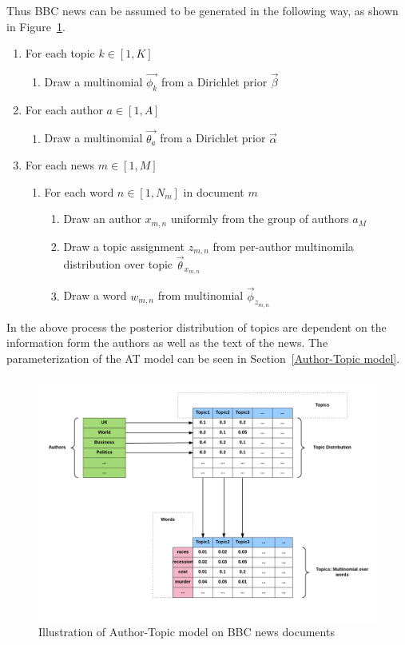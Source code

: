 Thus BBC news can be assumed to be generated in the following way, as shown in Figure~\ref{fig:author_diagram}.

\begin{enumerate}
   \item For each topic $k \in [1,K]$
   \begin{enumerate}
     \item Draw a multinomial $\vec{\phi_k}$ from a Dirichlet prior $\vec{\beta}$
    \end{enumerate}
   \item For each author $a \in [1,A]$
   \begin{enumerate}
     \item Draw a multinomial $\vec{\theta_a}$ from a Dirichlet prior $\vec{\alpha}$
    \end{enumerate}
    \item For each news $m \in [1,M]$
   \begin{enumerate}
     \item For each word $n \in [1,N_m]$ in document $m$
     \begin{enumerate}
            \item Draw an author $x_{m,n}$ uniformly from the group of authors $a_M$
            \item Draw a topic assignment $z_{m,n}$ from per-author multinomila distribution over topic $\vec{\theta}_{x_{m, n}}$ %
            \item Draw a word $w_{m,n}$ from multinomial $\vec{\phi}_{z_{m, n}}$
    \end{enumerate}
    \end{enumerate}
        
\end{enumerate}

In the above process the posterior distribution of topics are dependent on the information form the authors as well as the text of the news. The parameterization of the AT model can be seen in Section~\ref{Author-Topic model}.

\begin{figure}[h]
\centering
\includegraphics[width=\textwidth]{figures/author_diagram.png}
\caption{Illustration of Author-Topic model on BBC news documents}
\label{fig:author_diagram}
\end{figure}


